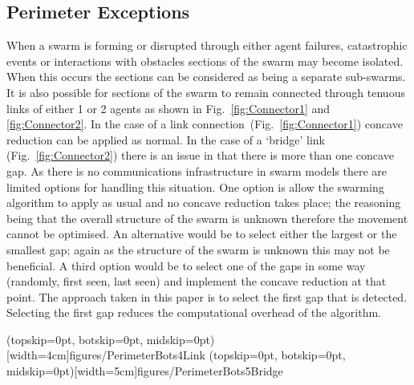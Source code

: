 \documentclass{ieeeaccess}
\begin{document}
\subsection{Perimeter Exceptions}\label{concave:Exceptions}
When a swarm is forming or disrupted through either agent failures, catastrophic events or interactions with obstacles sections of the swarm may become isolated. When this occurs the sections can be considered as being a separate sub-swarms. It is also possible for sections of the swarm to remain connected through tenuous links of either 1 or 2 agents as shown in Fig.~\ref{fig:Connector1} and \ref{fig:Connector2}. In the case of a link connection~(Fig.~\ref{fig:Connector1}) concave reduction can be applied as normal. In the case of a `bridge' link (Fig.~\ref{fig:Connector2}) there is an issue in that there is more than one concave gap. As there is no communications infrastructure in swarm models there are limited options for handling this situation. One option is allow the swarming algorithm to apply as usual and no concave reduction takes place; the reasoning being that the overall structure of the swarm is unknown therefore the movement cannot be optimised. An alternative would be to select either the largest or the smallest gap; again as the structure of the swarm is unknown this may not be beneficial. A third option would be to select one of the gaps in some way (randomly, first seen, last seen) and implement the concave reduction at that point. The approach taken in this paper is to select the first gap that is detected. Selecting the first gap reduces the computational overhead of the algorithm.

\Figure[t!](topskip=0pt, botskip=0pt, midskip=0pt)[width=4cm]{figures/PerimeterBots4}{Link\label{fig:Connector1}}
\Figure[t!](topskip=0pt, botskip=0pt, midskip=0pt)[width=5cm]{figures/PerimeterBots5}{Bridge\label{fig:Connector2}}
\end{document}
